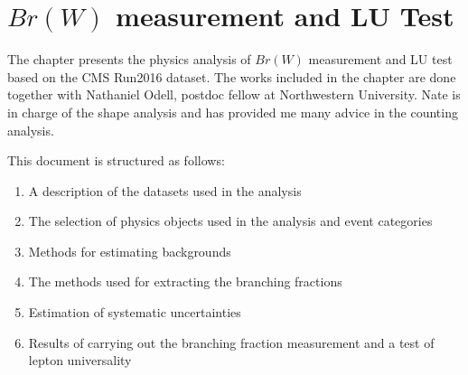 \chapter{$Br(W)$ measurement and LU Test}
\label{sec:analysis}


The chapter presents the physics analysis of $Br(W)$ measurement and LU test based on the CMS Run2016 dataset. 
The works included in the chapter are done together with Nathaniel Odell, postdoc fellow at Northwestern University.
Nate is in charge of the shape analysis and has provided me many advice in the counting analysis. 





This document is structured as follows:

\begin{enumerate}
    \item A description of the datasets used in the analysis
    \item The selection of physics objects used in the analysis and event categories
    \item Methods for estimating backgrounds
    \item The methods used for extracting the branching fractions
    \item Estimation of systematic uncertainties
    \item Results of carrying out the branching fraction measurement and a test of lepton universality
\end{enumerate}
    
    





